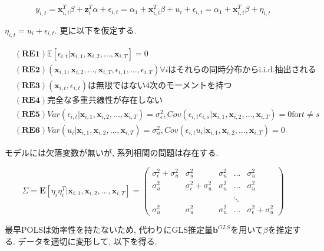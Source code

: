 \documentclass[paper=a4paper,fontsize=10pt]{jlreq}
\begin{document}
\begin{equation*}
  y_{i,t} = \mathbf{x}_{i,t}^T \beta + \mathbf{z}_{i}^T \alpha + \epsilon_{i,t} = \alpha_1 + \mathbf{x}_{i,t}^T \beta + {u}_i + \epsilon_{i,t} = \alpha_1 + \mathbf{x}_{i,t}^T \beta + \eta_{i,t}
\end{equation*}

$\eta_{i,t} = {u}_i + \epsilon_{i,t}$. 更に以下を仮定する.

\begin{align*}
  &\mathbf{(RE1)}　\mathbb{E}[\epsilon_{i,t}|\mathbf{x}_{i,1}, \mathbf{x}_{i,2}, \dots, \mathbf{x}_{i,T}]=0\\
  &\mathbf{(RE2)}　(\mathbf{x}_{i,1}, \mathbf{x}_{i,2}, \dots, \mathbf{x}_{i,T}, \epsilon_{i,1}, \dots, \epsilon_{i,T}) \forall i\text{はそれらの同時分布からi.i.d.抽出される}\\
  &\mathbf{(RE3)}　(\mathbf{x}_{i,t}, \epsilon_{i,t})\text{は無限ではない4次のモーメントを持つ}\\
  &\mathbf{(RE4)}　\text{完全な多重共線性が存在しない}\\
  &\mathbf{(RE5)}　Var(\epsilon_{i,t}|\mathbf{x}_{i,1}, \mathbf{x}_{i,2}, \dots, \mathbf{x}_{i,T}) = \sigma_\epsilon^2,　Cov(\epsilon_{i,t}\epsilon_{i,s}|\mathbf{x}_{i,1}, \mathbf{x}_{i,2}, \dots, \mathbf{x}_{i,T}) = 0　\text{for}　t \neq s\\
  &\mathbf{(RE6)}　{Var}({u}_{i}|\mathbf{x}_{i,1}, \mathbf{x}_{i,2}, \dots, \mathbf{x}_{i,T}) = \sigma_u^2,　Cov(\epsilon_{i,t}{u}_{i}|\mathbf{x}_{i,1}, \mathbf{x}_{i,2}, \dots, \mathbf{x}_{i,T}) = 0
\end{align*}

モデルには欠落変数が無いが, 系列相関の問題は存在する. 

\begin{equation*}
  \Sigma = \mathbf{E}[\eta_i\eta_i^T|\mathbf{x}_{i,1}, \mathbf{x}_{i,2}, \dots, \mathbf{x}_{i,T}]
  =
  \begin{pmatrix}
    \sigma_\epsilon^2 + \sigma_u^2 & \sigma_u^2 & \sigma_u^2 &\dots&\sigma_u^2\\
    \sigma_u^2 &\sigma_\epsilon^2 + \sigma_u^2 & \sigma_u^2 &\dots&\sigma_u^2\\
    \\
    &&&\ddots&\\
    \sigma_u^2&\sigma_u^2&\sigma_u^2&\dots&\sigma_\epsilon^2 + \sigma_u^2
  \end{pmatrix}
\end{equation*}

最早POLSは効率性を持たないため, 代わりにGLS推定量$\mathbf{b}^{GLS}$を用いて$\beta$を推定する. データを適切に変形して, 以下を得る.
\end{document}
